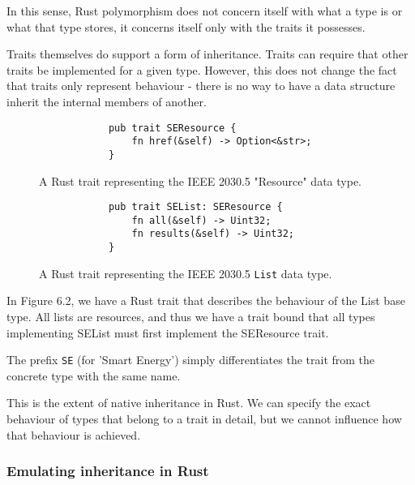 In this sense, Rust polymorphism does not concern itself with what a type is or what that type stores, it concerns itself only with the traits it possesses.

Traits themselves do support a form of inheritance. Traits can require that other traits be implemented for a given type. However, this does not change the fact that traits only represent behaviour - 
there is no way to have a data structure inherit the internal members of another.

\begin{figure}[H]
    \begin{center}
        \begin{lstlisting}
            pub trait SEResource {
                fn href(&self) -> Option<&str>;
            }
        \end{lstlisting}
        \caption{A Rust trait representing the IEEE 2030.5 "Resource" data type.}
    \end{center}
\end{figure}



\begin{figure}[H]
    \begin{center}
        \begin{lstlisting}
            pub trait SEList: SEResource {
                fn all(&self) -> Uint32;
                fn results(&self) -> Uint32;
            }
        \end{lstlisting}
        \caption{A Rust trait representing the IEEE 2030.5 \texttt{List} data type.}
    \end{center}
\end{figure}

In Figure 6.2, we have a Rust trait that describes the behaviour of the List base type. All lists are resources, and thus we have a trait bound that all types implementing SEList must first implement the SEResource trait.

The prefix \texttt{SE} (for 'Smart Energy') simply differentiates the trait from the concrete type with the same name.

This is the extent of native inheritance in Rust. We can specify the exact behaviour of types that belong to a trait in detail, but we cannot influence how that behaviour is achieved.

\subsubsection{Emulating inheritance in Rust}

